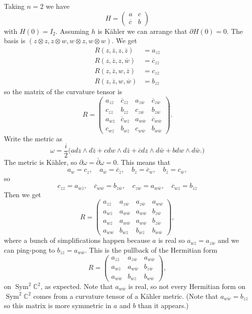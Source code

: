\documentclass[11pt]{article}
\theoremstyle{definition}
\newcommand{\kk}[1]{\mathbb{#1}}
\def\ov#1{\overline{#1}}
\DeclareMathOperator{\Sym}{Sym}
\begin{document}
Taking $n = 2$ we have
$$
H = \begin{pmatrix}
a & c
\\
\ov c & b
\end{pmatrix}
$$
with $H(0) = I_2$.
Assuming $h$ is K\"ahler we can arrange that $\partial H(0) = 0$.
The basis is $(z \otimes z, z \otimes w, w \otimes z, w \otimes w)$.
We get
\begin{align*}
R(z, \ov z, z, \ov z) &= a_{z \ov z}
\\
R(z, \ov z, z, \ov w) &= \ov c_{z \ov z}
\\
R(z, \ov z, w, \ov z) &= c_{z \ov z}
\\
R(z, \ov z, w, \ov w) &= b_{z \ov z}
\end{align*}
so the matrix of the curvature tensor is
$$
R = \begin{pmatrix}
a_{z \ov z} & \ov c_{z \ov z} & a_{z \ov w} & \ov c_{z \ov w}
\\
c_{z \ov z} & b_{z \ov z} & c_{z \ov w} & b_{z \ov w}
\\
a_{w \ov z} & \ov c_{w \ov z} & a_{w \ov w} & \ov c_{w \ov w}
\\
c_{w \ov z} & b_{w \ov z} & c_{w \ov w} & b_{w \ov w}
\end{pmatrix}.
$$
Write the metric as
$$
\omega
= \frac i2 \bigl(
a dz \wedge d\bar z
+ c dw \wedge d \bar z
+ \ov c dz \wedge d\bar w
+ b dw \wedge d\bar w.
\bigr)
$$
The metric is K\"ahler, so $\partial \omega = \bar\partial \omega = 0$.
This means that
$$
a_w = c_{z},
\quad
a_{\ov w} = \ov c_{\ov z},
\quad
b_z = \ov c_w,
\quad
b_{\ov z} = c_{\ov w},
$$
so
$$
c_{z \ov z} = a_{w \ov z},
\quad
\ov c_{w \ov w} = b_{z \ov w},
\quad
c_{z \ov w} = a_{w \ov w},
\quad
\ov c_{w \ov z} = b_{z \ov z}
$$
Then we get
$$
R = \begin{pmatrix}
a_{z \ov z} & a_{z \ov w} & a_{z \ov w} & a_{w \ov w}
\\
a_{w \ov z} & a_{w \ov w} & a_{w \ov w} & b_{z \ov w}
\\
a_{w \ov z} & a_{w \ov w} & a_{w \ov w} & b_{z \ov w}
\\
a_{w \ov w} & b_{w \ov z} & b_{w \ov z} & b_{w \ov w}
\end{pmatrix},
$$
where a bunch of simplifications happen because $a$ is real so $a_{w \ov z} =
a_{z \ov w}$ and we can ping-pong to $b_{z \ov z} = a_{w \ov w}$.
This is the pullback of the Hermitian form
$$
R = \begin{pmatrix}
a_{z \ov z} & a_{z \ov w} & a_{w \ov w}
\\
a_{w \ov z} & a_{w \ov w} & b_{z \ov w}
\\
a_{w \ov w} & b_{w \ov z} & b_{w \ov w}
\end{pmatrix},
$$
on $\Sym^2 \kk C^2$, as expected.
Note that $a_{w \ov w}$ is real, so not every Hermitian form on
$\Sym^2 \kk C^2$ comes from a curvature tensor of a K\"ahler metric.
(Note that $a_{w \ov w} = b_{z \ov z}$ so this matrix is more symmetric in $a$
and $b$ than it appears.)
\end{document}
